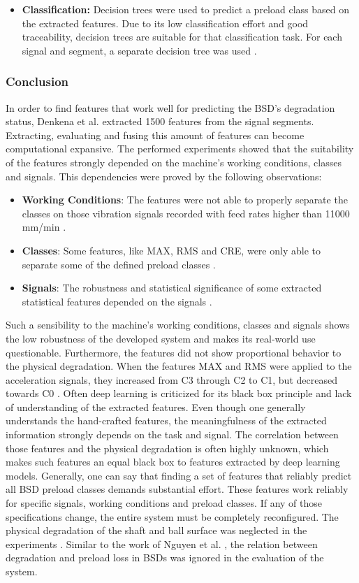 \begin{itemize}
    \item \textbf{Classification:} Decision trees were used to predict a preload class based on the extracted features. Due to its low classification effort and good traceability, decision trees are suitable for that classification task. For each signal and segment, a separate decision tree was used \cite{Denkena2021}. 
\end{itemize}

\subsubsection{Conclusion}
In order to find features that work well for predicting the BSD's degradation status, Denkena et al. \cite{Denkena2021} extracted 1500 features from the signal segments. Extracting, evaluating and fusing this amount of features can become computational expansive. The performed experiments showed that the suitability of the features strongly depended on the machine's working conditions, classes and signals. This dependencies were proved by the following observations:
\begin{itemize}
    \item \textbf{Working Conditions}: The features were not able to properly separate the classes on those vibration signals recorded with feed rates higher than 11000 mm/min \cite{Denkena2021}. 
    \item \textbf{Classes}: Some features, like MAX, RMS and CRE, were only able to separate some of the defined preload classes \cite{Denkena2021}. 
    \item \textbf{Signals}: The robustness and statistical significance of some extracted statistical features depended on the signals \cite{Denkena2021}. 
\end{itemize}
Such a sensibility to the machine's working conditions, classes and signals shows the low robustness of the developed system and makes its real-world use questionable. Furthermore, the features did not show proportional behavior to the physical degradation. When the features MAX and RMS were applied to the acceleration signals, they increased from C3 through C2 to C1, but decreased towards C0 \cite{Denkena2021}. Often deep learning is criticized for its black box principle and lack of understanding of the extracted features. Even though one generally understands the hand-crafted features, the meaningfulness of the extracted information strongly depends on the task and signal. The correlation between those features and the physical degradation is often highly unknown, which makes such features an equal black box to features extracted by deep learning models. Generally, one can say that finding a set of features that reliably predict all BSD preload classes demands substantial effort. These features work reliably for specific signals, working conditions and preload classes. If any of those specifications change, the entire system must be completely reconfigured. The physical degradation of the shaft and ball surface was neglected in the experiments \cite{Denkena2021}. Similar to the work of Nguyen et al. \cite{NGUYEN2019}, the relation between degradation and preload loss in BSDs was ignored in the evaluation of the system. 

